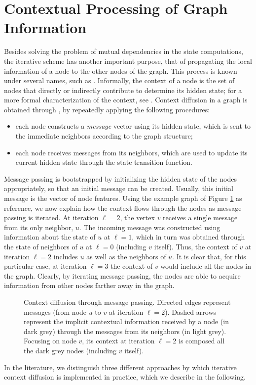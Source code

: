 \section{Contextual Processing of Graph Information}
Besides solving the problem of mutual dependencies in the state computations, the iterative scheme has another important purpose, that of propagating the local information of a node to the other nodes of the graph. This process is known under several names, such as . Informally, the context of a node is the set of nodes that directly or indirectly contribute to determine its hidden state; for a more formal characterization of the context, see \citep{micheli2009nn4g}. Context diffusion in a graph is obtained through , \ie by repeatedly applying the following procedures:
\begin{itemize}
    \item each node constructs a \emph{message} vector using its hidden state, which is sent to the immediate neighbors according to the graph structure;
    \item each node receives messages from its neighbors, which are used to update its current hidden state through the state transition function.
\end{itemize}
Message passing is bootstrapped by initializing the hidden state of the nodes appropriately, so that an initial message can be created. Usually, this initial message is the vector of node features. Using the example graph of Figure \ref{fig:context-diffusion} as reference, we now explain how the context flows through the nodes as message passing is iterated. At iteration $\ell=2$, the vertex $v$ receives a single message from its only neighbor, $u$. The incoming message was constructed using information about the state of $u$ at $\ell=1$, which in turn was obtained through the state of neighbors of $u$ at $\ell=0$ (including $v$ itself). Thus, the context of $v$ at iteration $\ell=2$ includes $u$ as well as the neighbors of $u$. It is clear that, for this particular case, at iteration $\ell=3$ the context of $v$ would include all the nodes in the graph. Clearly, by iterating message passing, the nodes are able to acquire information from other nodes farther away in the graph.
\begin{figure}[h!]
    \centering
    \resizebox{.8\textwidth}{!}{}
    \caption{Context diffusion through message passing. Directed edges represent messages (\eg from node $u$ to $v$ at iteration $\ell=2$). Dashed arrows represent the implicit contextual information received by a node (in dark grey) through the messages from its neighbors (in light grey). Focusing on node $v$, its context at iteration $\ell=2$ is composed all the dark grey nodes (including $v$ itself).}
    \label{fig:context-diffusion}
\end{figure}
In the literature, we distinguish three different approaches by which iterative context diffusion is implemented in practice, which we describe in the following.

